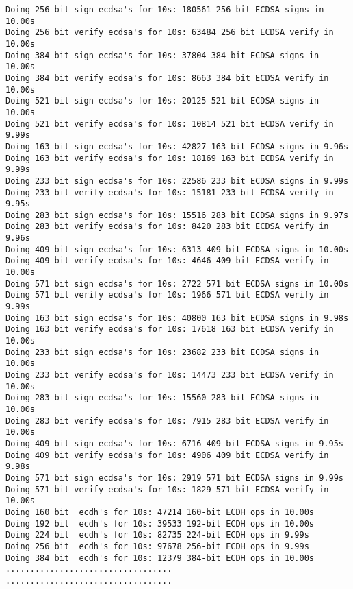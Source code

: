 \documentclass[a4paper,11pt]{article}
\theoremstyle{mytheor}
\begin{document}
\begin{lstlisting}
Doing 256 bit sign ecdsa's for 10s: 180561 256 bit ECDSA signs in 10.00s 
Doing 256 bit verify ecdsa's for 10s: 63484 256 bit ECDSA verify in 10.00s
Doing 384 bit sign ecdsa's for 10s: 37804 384 bit ECDSA signs in 10.00s 
Doing 384 bit verify ecdsa's for 10s: 8663 384 bit ECDSA verify in 10.00s
Doing 521 bit sign ecdsa's for 10s: 20125 521 bit ECDSA signs in 10.00s 
Doing 521 bit verify ecdsa's for 10s: 10814 521 bit ECDSA verify in 9.99s
Doing 163 bit sign ecdsa's for 10s: 42827 163 bit ECDSA signs in 9.96s 
Doing 163 bit verify ecdsa's for 10s: 18169 163 bit ECDSA verify in 9.99s
Doing 233 bit sign ecdsa's for 10s: 22586 233 bit ECDSA signs in 9.99s 
Doing 233 bit verify ecdsa's for 10s: 15181 233 bit ECDSA verify in 9.95s
Doing 283 bit sign ecdsa's for 10s: 15516 283 bit ECDSA signs in 9.97s 
Doing 283 bit verify ecdsa's for 10s: 8420 283 bit ECDSA verify in 9.96s
Doing 409 bit sign ecdsa's for 10s: 6313 409 bit ECDSA signs in 10.00s 
Doing 409 bit verify ecdsa's for 10s: 4646 409 bit ECDSA verify in 10.00s
Doing 571 bit sign ecdsa's for 10s: 2722 571 bit ECDSA signs in 10.00s 
Doing 571 bit verify ecdsa's for 10s: 1966 571 bit ECDSA verify in 9.99s
Doing 163 bit sign ecdsa's for 10s: 40800 163 bit ECDSA signs in 9.98s 
Doing 163 bit verify ecdsa's for 10s: 17618 163 bit ECDSA verify in 10.00s
Doing 233 bit sign ecdsa's for 10s: 23682 233 bit ECDSA signs in 10.00s 
Doing 233 bit verify ecdsa's for 10s: 14473 233 bit ECDSA verify in 10.00s
Doing 283 bit sign ecdsa's for 10s: 15560 283 bit ECDSA signs in 10.00s 
Doing 283 bit verify ecdsa's for 10s: 7915 283 bit ECDSA verify in 10.00s
Doing 409 bit sign ecdsa's for 10s: 6716 409 bit ECDSA signs in 9.95s 
Doing 409 bit verify ecdsa's for 10s: 4906 409 bit ECDSA verify in 9.98s
Doing 571 bit sign ecdsa's for 10s: 2919 571 bit ECDSA signs in 9.99s 
Doing 571 bit verify ecdsa's for 10s: 1829 571 bit ECDSA verify in 10.00s
Doing 160 bit  ecdh's for 10s: 47214 160-bit ECDH ops in 10.00s
Doing 192 bit  ecdh's for 10s: 39533 192-bit ECDH ops in 10.00s
Doing 224 bit  ecdh's for 10s: 82735 224-bit ECDH ops in 9.99s
Doing 256 bit  ecdh's for 10s: 97678 256-bit ECDH ops in 9.99s
Doing 384 bit  ecdh's for 10s: 12379 384-bit ECDH ops in 10.00s
..................................
..................................
\end{lstlisting}
\end{document}
